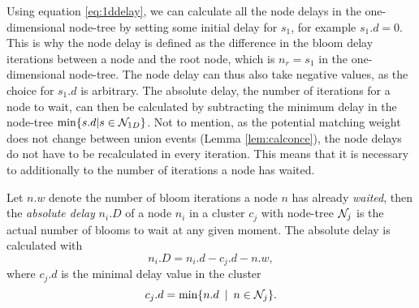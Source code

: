 Using equation \eqref{eq:1ddelay}, we can calculate all the node delays in the one-dimensional node-tree by setting some initial delay for $s_1$, for example $s_1.d=0$. This is why the node delay is defined as the difference in the bloom delay iterations between a node and the root node, which is $n_r=s_1$ in the one-dimensional node-tree. The node delay can thus also take negative values, as the choice for $s_1.d$ is arbitrary. The absolute delay, the number of iterations for a node to wait, can then be calculated by subtracting the minimum delay in the node-tree $\min \{s.d | s \in \mathcal{N}_{1D}\}$. Not to mention, as the potential matching weight does not change between union events (Lemma \ref{lem:calconce}), the node delays do not have to be recalculated in every iteration. This means that it is necessary to additionally to the number of iterations a node has waited.
\begin{definition}\label{def:absolutedelay}
  Let $n.w$ denote the number of bloom iterations a node $n$ has already \emph{waited}, then the \emph{absolute delay} $n_i.D$ of a node $n_i$ in a cluster $c_j$ with node-tree $\mathcal{N}_j$ is the actual number of blooms to wait at any given moment. The absolute delay is calculated with
  \begin{equation}\label{eq:absulutedelay}
    n_i.D = n_i.d - c_j.d - n.w, 
  \end{equation}
  where $c_j.d$ is the minimal delay value in the cluster
  \begin{equation}\label{eq:cd}
    c_j.d = \min \{n.d \hspace{.5em} | \hspace{.5em} n\in \mathcal{N}_j\}.
  \end{equation}
\end{definition}
